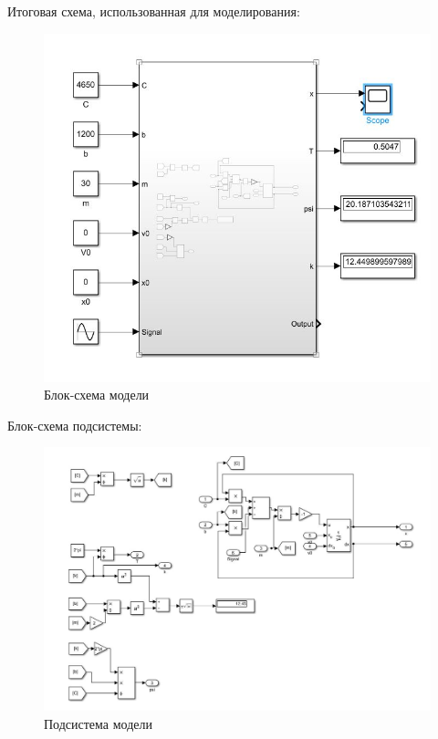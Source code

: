 \documentclass{article}
\begin{document}
	Итоговая схема, использованная для моделирования:
	\begin{figure}[H]
		\centering
		\includegraphics[width=0.7\linewidth]{schem4}
		\caption{Блок-схема модели}

	\end{figure}
	Блок-схема подсистемы:
	\begin{figure}[H]
		\centering
		\includegraphics[width=0.7\linewidth]{schem6}
		\caption{Подсистема модели}
	\end{figure}
	


	
\end{document}
